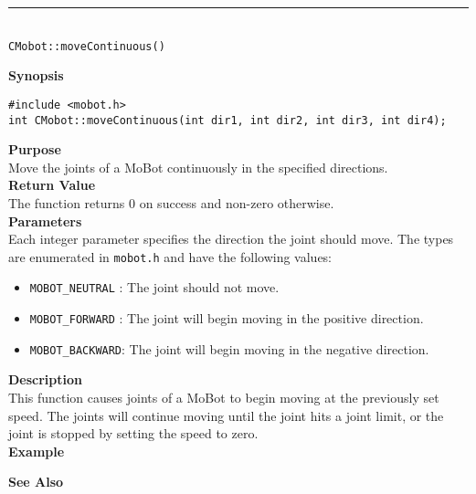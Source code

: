 \noindent
\vspace{5pt}
\rule{4.5in}{0.015in}\\
\noindent
{\LARGE \texttt{CMobot::moveContinuous()}}\\
{}

\noindent
{\bf Synopsis}\\
\begin{verbatim}
#include <mobot.h>
int CMobot::moveContinuous(int dir1, int dir2, int dir3, int dir4);
\end{verbatim}

\noindent
{\bf Purpose}\\
Move the joints of a MoBot continuously in the specified directions.\\

\noindent
{\bf Return Value}\\
The function returns 0 on success and non-zero otherwise.\\

\noindent
{\bf Parameters}\\
Each integer parameter specifies the direction the joint should move. The types
are enumerated in \texttt{mobot.h} and have the following values:
\begin{itemize}
\item \texttt{MOBOT\_NEUTRAL} : The joint should not move.
\item \texttt{MOBOT\_FORWARD} : The joint will begin moving in the positive direction.
\item \texttt{MOBOT\_BACKWARD}: The joint will begin moving in the negative direction.
\end{itemize}

\noindent
{\bf Description}\\
This function causes joints of a MoBot to begin moving at the previously set
speed. The joints will continue moving until the joint hits a joint limit, or
the joint is stopped by setting the speed to zero.\\

\noindent
{\bf Example}\\
\noindent

\noindent
{\bf See Also}\\


